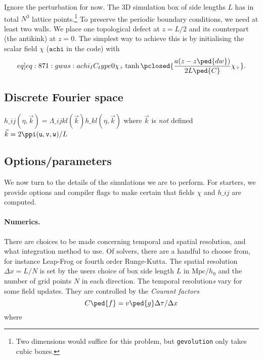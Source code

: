     Ignore the perturbation for now. The 3D simulation box of side lengths $L$ has in total $N^3$ lattice points.\footnote{Two dimensions would suffice for this problem, but \texttt{gevolution} only takes cubic boxes.} %
    To preserve the periodic boundary conditions, we need at least two walls. We place one topological defect at $z=L/2$ and its counterpart (the antikink) at $z=0$. The simplest way to achieve this is by initialising the scalar field $\chi$ ($\texttt{achi}$ in the code) with
    \begin{equation}\label[eq]{eq:871:gwas:achi_IC_type0}
        \chi_+ \tanh{ \pclosed{ \frac{a(z-z\ped{dw})}{2L\ped{C}} \chi_+ } }.
    \end{equation}







\subsection{Discrete Fourier space}
    \blahblah

    $h\_{ij}(\eta, \vec{k}) = \Lambda\_{ijkl}(\vec{k}) h\_{kl}(\eta,\vec{k})$ where $\vec{k}$ is \emph{not} defined $\vec{k} = 2\ppi (\lcoord{u},\lcoord{v},\lcoord{w})/ L $

\subsection{Options/parameters}
    We now turn to the details of the simulations we are to perform. For starters, we provide options and compiler flags to make certain that fields $\chi$ and $h\_{ij}$ are computed. 

    
    \paragraph{Numerics.} %
    There are choices to be made concerning temporal and spatial resolution, and what integration method to use. Of solvers, there are a handful to choose from, for instance Leap-Frog or fourth order Runge-Kutta. The spatial resolution $\Delta x= L/N$ is set by the users choice of box side length $L$ in $\text{Mpc}/h_0$ and the number of grid points $N$ in each direction. The temporal resolution\emph{s} vary for some field updates. They are controlled by the \emph{Courant factors}
    \begin{equation}
        C\ped{f} = v\ped{g} \Delta \tau / \Delta x 
    \end{equation}
    where \blahblah

